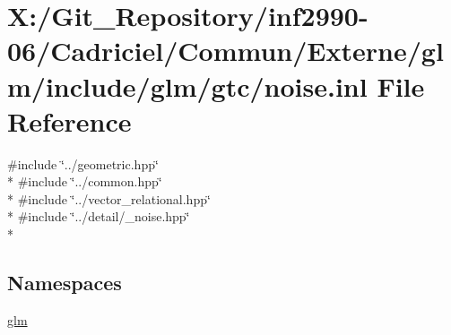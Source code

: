\hypertarget{noise_8inl}{\section{X\-:/\-Git\-\_\-\-Repository/inf2990-\/06/\-Cadriciel/\-Commun/\-Externe/glm/include/glm/gtc/noise.inl File Reference}
\label{noise_8inl}
}
{\ttfamily \#include \char`\"{}../geometric.\-hpp\char`\"{}}\\*
{\ttfamily \#include \char`\"{}../common.\-hpp\char`\"{}}\\*
{\ttfamily \#include \char`\"{}../vector\-\_\-relational.\-hpp\char`\"{}}\\*
{\ttfamily \#include \char`\"{}../detail/\-\_\-noise.\-hpp\char`\"{}}\\*
\subsection*{Namespaces}
\begin{DoxyCompactItemize}
\item 
\hyperlink{namespaceglm}{glm}
\end{DoxyCompactItemize}
